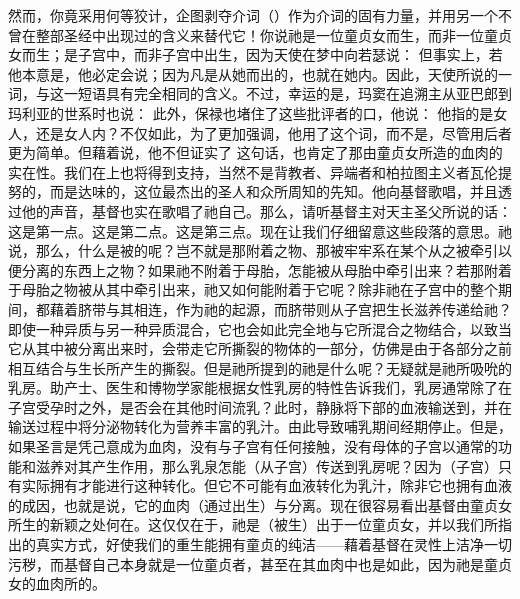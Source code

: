 然而，你竟采用何等狡计，企图剥夺介词（）作为介词的固有力量，并用另一个不曾在整部圣经中出现过的含义来替代它！你说祂是一位童贞女而生，而非一位童贞女而生；是子宫中，而非子宫中出生，因为天使在梦中向若瑟说： 但事实上，若他本意是，他必定会说；因为凡是从她而出的，也就在她内。因此，天使所说的一词，与这一短语具有完全相同的含义。不过，幸运的是，玛窦在追溯主从亚巴郎到玛利亚的世系时也说： 此外，保禄也堵住了这些批评者的口，他说： 他指的是女人，还是女人内？不仅如此，为了更加强调，他用了这个词，而不是，尽管用后者更为简单。但藉着说，他不但证实了 这句话，也肯定了那由童贞女所造的血肉的实在性。我们在上也将得到支持，当然不是背教者、异端者和柏拉图主义者瓦伦提努的，而是达味的，这位最杰出的圣人和众所周知的先知。他向基督歌唱，并且透过他的声音，基督也实在歌唱了祂自己。那么，请听基督主对天主圣父所说的话：这是第一点。这是第二点。这是第三点。\newline{}现在让我们仔细留意这些段落的意思。祂说，那么，什么是被的呢？岂不就是那附着之物、那被牢牢系在某个从之被牵引以便分离的东西上之物？如果祂不附着于母胎，怎能被从母胎中牵引出来？若那附着于母胎之物被从其中牵引出来，祂又如何能附着于它呢？除非祂在子宫中的整个期间，都藉着脐带与其相连，作为祂的起源，而脐带则从子宫把生长滋养传递给祂？即使一种异质与另一种异质混合，它也会如此完全地与它所混合之物结合，以致当它从其中被分离出来时，会带走它所撕裂的物体的一部分，仿佛是由于各部分之前相互结合与生长所产生的撕裂。但是祂所提到的祂是什么呢？无疑就是祂所吸吮的乳房。助产士、医生和博物学家能根据女性乳房的特性告诉我们，乳房通常除了在子宫受孕时之外，是否会在其他时间流乳？此时，静脉将下部的血液输送到，并在输送过程中将分泌物转化为营养丰富的乳汁。由此导致哺乳期间经期停止。但是，如果圣言是凭己意成为血肉，没有与子宫有任何接触，没有母体的子宫以通常的功能和滋养对其产生作用，那么乳泉怎能（从子宫）传送到乳房呢？因为（子宫）只有实际拥有才能进行这种转化。但它不可能有血液转化为乳汁，除非它也拥有血液的成因，也就是说，它的血肉（通过出生）与分离。\newline{}现在很容易看出基督由童贞女所生的新颖之处何在。这仅仅在于，祂是（被生）出于一位童贞女，并以我们所指出的真实方式，好使我们的重生能拥有童贞的纯洁——藉着基督在灵性上洁净一切污秽，而基督自己本身就是一位童贞者，甚至在其血肉中也是如此，因为祂是童贞女的血肉所的。\par

